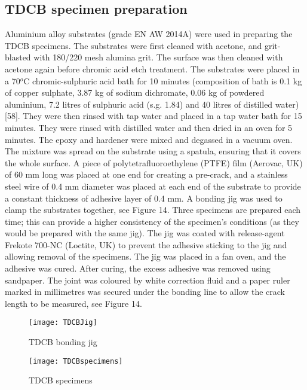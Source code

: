 \documentclass[numbers=noendperiod,chapterprefix=on]{icldt} %
\begin{document}
\subsection{TDCB specimen preparation}
Aluminium alloy substrates (grade EN AW 2014A) were used in preparing the TDCB specimens. The substrates were first cleaned with acetone, and grit-blasted with 180/220 mesh alumina grit. The surface was then cleaned with acetone again before chromic acid etch treatment. The substrates were placed in a 70$^o$C chromic-sulphuric acid bath for 10 minutes (composition of bath is 0.1 kg of copper sulphate, 3.87 kg of sodium dichromate, 0.06 kg of powdered aluminium, 7.2 litres of sulphuric acid (s.g. 1.84) and 40 litres of distilled water) [58]. They were then rinsed with tap water and placed in a tap water bath for 15 minutes. They were rinsed with distilled water and then dried in an oven for 5 minutes.
The epoxy and hardener were mixed and degassed in a vacuum oven. The mixture was spread on the substrate using a spatula, ensuring that it covers the whole surface. A piece of polytetrafluoroethylene (PTFE) film (Aerovac, UK) of 60 mm long was placed at one end for creating a pre-crack, and a stainless steel wire of 0.4 mm diameter was placed at each end of the substrate to provide a constant thickness of adhesive layer of 0.4 mm.
A bonding jig was used to clamp the substrates together, see Figure 14. Three specimens are prepared each time; this can provide a higher consistency of the specimen’s conditions (as they would be prepared with the same jig). The jig was coated with release-agent Frekote 700-NC (Loctite, UK) to prevent the adhesive sticking to the jig and allowing removal of the specimens. The jig was placed in a fan oven, and the adhesive was cured.
After curing, the excess adhesive was removed using sandpaper. The joint was coloured by white correction fluid and a paper ruler marked in millimetres was secured under the bonding line to allow the crack length to be measured, see Figure 14.

\begin{figure}[!htpb]
\centering
\texttt{[image: TDCBJig]}
\caption{TDCB bonding jig} %
\end{figure}

\begin{figure}[!htpb]
\centering
\texttt{[image: TDCBspecimens]}
\caption{TDCB specimens} %
\end{figure}
\end{document}
